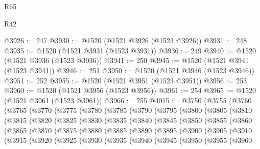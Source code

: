 \begin{lexlean}{R65}
\begin{lexlean}{R42}
\begin{coremodule}
{{{{{{{{{{{{{{{{{{{{{{{{{{{{{{{{{{{{{{{{{{{{{{{{{{{{{{{{{{{{{{{{{{{{{{{{{{{{{{{{{{{{{{{{{{{{{{{{{{{{{{{{{{{{{{{{{{{{{{{{{{{{{{{{{{{{{{{{{{{{{{{{{{{{{{{{{{{{{{{{{{{{{{{{{{{{{{{{{{{{{{{{@3926 := 247
@3930 := @1520 (@1521 @3926 (@1523 @3926))
@3931 := 248
@3935 := @1520 (@1521 @3931 (@1523 @3931))
@3936 := 249
@3940 := @1520 (@1521 @3936 (@1523 @3936))
@3941 := 250
@3945 := @1520 (@1521 @3941 (@1523 @3941))
@3946 := 251
@3950 := @1520 (@1521 @3946 (@1523 @3946))
@3951 := 252
@3955 := @1520 (@1521 @3951 (@1523 @3951))
@3956 := 253
@3960 := @1520 (@1521 @3956 (@1523 @3956))
@3961 := 254
@3965 := @1520 (@1521 @3961 (@1523 @3961))
@3966 := 255
@4015 := @3750
    (@3755
      (@3760
        (@3765
          (@3770
            (@3775
              (@3780
                (@3785
                  (@3790
                    (@3795
                      (@3800
                        (@3805
                          (@3810
                            (@3815
                              (@3820
                                (@3825
                                  (@3830
                                    (@3835
                                      (@3840
                                        (@3845
                                          (@3850
                                            (@3855
                                              (@3860
                                                (@3865
                                                  (@3870
                                                    (@3875
                                                      (@3880
                                                        (@3885
                                                          (@3890
                                                            (@3895
                                                              (@3900
                                                                (@3905
                                                                  (@3910
                                                                    (@3915
                                                                      (@3920
                                                                        (@3925
                                                                          (@3930
                                                                            (@3935
                                                                              (@3940
                                                                                (@3945
                                                                                  (@3950
                                                                                    (@3955
                                                                                      (@3960
}}}}}}}}}}}}}}}}}}}}}}}}}}}}}}}}}}}}}}}}}}}}}}}}}}}}}}}}}}}}}}}}}}}}}}}}}}}}}}}}}}}}}}}}}}}}}}}}}}}}}}}}}}}}}}}}}}}}}}}}}}}}}}}}}}}}}}}}}}}}}}}}}}}}}}}}}}}}}}}}}}}}}}}}}}}}}}}}}}}}}}}}
\end{coremodule}
\end{lexlean}
\end{lexlean}
